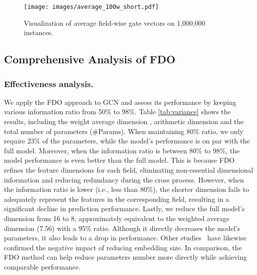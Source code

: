 \documentclass[sigconf]{acmart}
\begin{document}
\begin{figure}[t]
\setlength{\abovecaptionskip}{0.2cm}
\setlength{\belowcaptionskip}{-0.2cm}
\centering
\texttt{[image: images/average\_100w\_short.pdf]}
\caption{Visualization of average field-wise gate vectors on 1,000,000 instances.}
\label{fig:100w_gate values}
\end{figure}




\subsection{Comprehensive Analysis of FDO}
\label{exp:dimension optimization}

\subsubsection{Effectiveness analysis.} We apply the FDO approach to GCN and assess its performance by keeping various information ratio from 50\% to 98\%. Table \ref{tab:variance} shows the results, including the weight average dimension , arithmetic dimension  and the total number of parameters (\#Params). When maintaining 80\% ratio, we only require 23\% of the parameters, while the model's performance is on par with the full model. Moreover, when the information ratio is between 80\% to 98\%, the model performance is even better than the full model. This is because FDO refines the feature dimensions for each field, eliminating non-essential dimensional information and reducing redundancy during the cross process. However, when the information ratio is lower (i.e., less than 80\%), the shorter dimension fails to adequately represent the features in the corresponding field, resulting in a significant decline in prediction performance. Lastly, we reduce the full model's dimension from 16 to 8, approximately equivalent to the weighted average dimension (7.56) with a 95\% ratio. Although it directly decreases the model's parameters, it also leads to a drop in performance. Other studies~\cite{song2019autoint, he2017ncf, he2017neural, sun2020generic} have likewise confirmed the negative impact of reducing embedding size. In comparison, the FDO method can help reduce parameters number more directly while achieving comparable performance.
\end{document}
